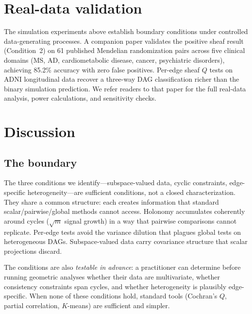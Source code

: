 \documentclass[11pt]{article}
\begin{document}
\section{Real-data validation}
\label{sec:realdata}

The simulation experiments above establish boundary conditions under controlled data-generating processes. A companion paper \citep{tower2026sheaf} validates the positive sheaf result (Condition~2) on 61 published Mendelian randomization pairs across five clinical domains (MS, AD, cardiometabolic disease, cancer, psychiatric disorders), achieving 85.2\% accuracy with zero false positives. Per-edge sheaf $Q$ tests on ADNI longitudinal data recover a three-way DAG classification richer than the binary simulation prediction. We refer readers to that paper for the full real-data analysis, power calculations, and sensitivity checks.

\section{Discussion}
\label{sec:discussion}

\subsection{The boundary}

The three conditions we identify---subspace-valued data, cyclic constraints, edge-specific heterogeneity---are sufficient conditions, not a closed characterization.
They share a common structure: each creates information that standard scalar/pairwise/global methods cannot access.
Holonomy accumulates coherently around cycles ($\sqrt{m}$ signal growth) in a way that pairwise comparisons cannot replicate.
Per-edge tests avoid the variance dilution that plagues global tests on heterogeneous DAGs.
Subspace-valued data carry covariance structure that scalar projections discard.

The conditions are also \emph{testable in advance}: a practitioner can determine before running geometric analyses whether their data are multivariate, whether consistency constraints span cycles, and whether heterogeneity is plausibly edge-specific.
When none of these conditions hold, standard tools (Cochran's $Q$, partial correlation, $K$-means) are sufficient and simpler.
\end{document}
